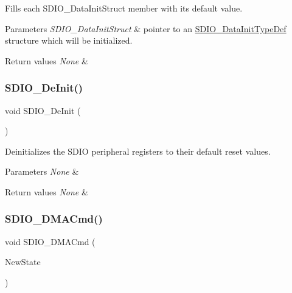 Fills each S\+D\+I\+O\+\_\+\+Data\+Init\+Struct member with its default value. 


\begin{DoxyParams}{Parameters}
{\em S\+D\+I\+O\+\_\+\+Data\+Init\+Struct} & pointer to an \mbox{\hyperlink{struct_s_d_i_o___data_init_type_def}{S\+D\+I\+O\+\_\+\+Data\+Init\+Type\+Def}} structure which will be initialized. \\
\hline
\end{DoxyParams}

\begin{DoxyRetVals}{Return values}
{\em None} & \\
\hline
\end{DoxyRetVals}
\mbox{\label{group___s_d_i_o___exported___functions_gac359d2c6c67a2590f8f9b720c0e4ff1b}} 
\subsubsection{\texorpdfstring{SDIO\_DeInit()}{SDIO\_DeInit()}}
{\footnotesize\ttfamily void S\+D\+I\+O\+\_\+\+De\+Init (\begin{DoxyParamCaption}\item[{void}]{ }\end{DoxyParamCaption})}



Deinitializes the S\+D\+IO peripheral registers to their default reset values. 


\begin{DoxyParams}{Parameters}
{\em None} & \\
\hline
\end{DoxyParams}

\begin{DoxyRetVals}{Return values}
{\em None} & \\
\hline
\end{DoxyRetVals}
\mbox{\label{group___s_d_i_o___exported___functions_gad36fde5ec0ce0c2089b9d971c2271e6e}} 
\subsubsection{\texorpdfstring{SDIO\_DMACmd()}{SDIO\_DMACmd()}}
{\footnotesize\ttfamily void S\+D\+I\+O\+\_\+\+D\+M\+A\+Cmd (\begin{DoxyParamCaption}\item[{\mbox{\hyperlink{group___exported__types_gac9a7e9a35d2513ec15c3b537aaa4fba1}{Functional\+State}}}]{New\+State }\end{DoxyParamCaption})}



